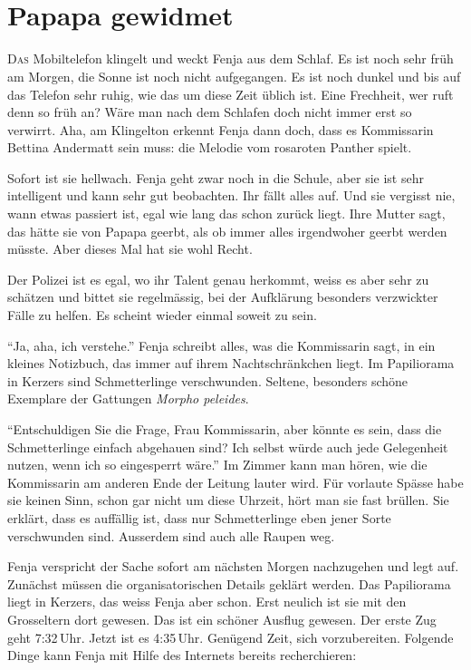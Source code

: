 \chapter*{{}\\\small \color{DeepPink} Papapa gewidmet}
\lettrine[lines=3]{\color{DeepPink}D}{as} Mobiltelefon klingelt und weckt Fenja aus dem Schlaf. Es ist noch sehr früh am Morgen, die Sonne ist noch nicht aufgegangen. Es ist noch dunkel und bis auf das Telefon sehr ruhig, wie das um diese Zeit üblich ist. Eine Frechheit, wer ruft denn so früh an? Wäre man nach dem Schlafen doch nicht immer erst so verwirrt. Aha, am Klingelton erkennt Fenja dann doch, dass es Kommissarin Bettina Andermatt sein muss: die Melodie vom rosaroten Panther spielt.

Sofort ist sie hellwach. Fenja geht zwar noch in die Schule, aber sie ist sehr intelligent und kann sehr gut beobachten. Ihr fällt alles auf. Und sie vergisst nie, wann etwas passiert ist, egal wie lang das schon zurück liegt. Ihre Mutter sagt, das hätte sie von Papapa geerbt, als ob immer alles irgendwoher geerbt werden müsste. Aber dieses Mal hat sie wohl Recht. 

Der Polizei ist es egal, wo ihr Talent genau herkommt, weiss es aber sehr zu schätzen und bittet sie regelmässig, bei der Aufklärung besonders verzwickter Fälle zu helfen. Es scheint wieder einmal soweit zu sein.

\enquote{Ja, aha, ich verstehe.} Fenja schreibt alles, was die Kommissarin sagt, in ein kleines Notizbuch, das immer auf ihrem Nachtschränkchen liegt. Im Papiliorama in Kerzers sind Schmetterlinge verschwunden. Seltene, besonders schöne Exemplare der Gattungen \emph{Morpho peleides}.

\enquote{Entschuldigen Sie die Frage, Frau Kommissarin, aber könnte es sein, dass die Schmetterlinge einfach abgehauen sind? Ich selbst würde auch jede Gelegenheit nutzen, wenn ich so eingesperrt wäre.} Im Zimmer kann man hören, wie die Kommissarin am anderen Ende der Leitung lauter wird. Für vorlaute Spässe habe sie keinen Sinn, schon gar nicht um diese Uhrzeit, hört man sie fast brüllen. Sie erklärt, dass es auffällig ist, dass nur Schmetterlinge eben jener Sorte verschwunden sind. Ausserdem sind auch alle Raupen weg.

Fenja verspricht der Sache sofort am nächsten Morgen nachzugehen und legt auf. Zunächst müssen die organisatorischen Details geklärt werden. Das Papiliorama liegt in Kerzers, das weiss Fenja aber schon. Erst neulich ist sie mit den Grosseltern dort gewesen. Das ist ein schöner Ausflug gewesen. Der erste Zug geht 7:32\,Uhr. Jetzt ist es 4:35\,Uhr. Genügend Zeit, sich vorzubereiten. Folgende Dinge kann Fenja mit Hilfe des Internets bereits recherchieren:

